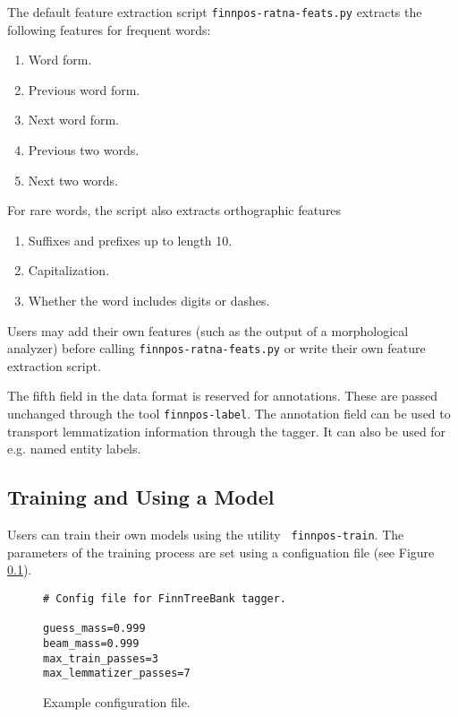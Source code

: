 \documentclass{llncs}
\begin{document}
The default feature extraction script {\tt finnpos-ratna-feats.py}
extracts the following features for frequent words:

\begin{enumerate}
\item Word form.
\item Previous word form.
\item Next word form.
\item Previous two words.
\item Next two words.
\end{enumerate}

For rare words, the script also extracts orthographic features

\begin{enumerate}
\item Suffixes and prefixes up to length 10.
\item Capitalization.
\item Whether the word includes digits or dashes.
\end{enumerate}

Users may add their own features (such as the output of a
morphological analyzer) before calling {\tt finnpos-ratna-feats.py} or
write their own feature extraction script.

The fifth field in the data format is reserved for annotations. These
are passed unchanged through the tool {\tt finnpos-label}. The
annotation field can be used to transport lemmatization information
through the tagger. It can also be used for e.g. named entity labels.

\subsection{Training and Using a Model}

Users can train their own models using the utility {\tt
  finnpos-train}. The parameters of the training process are set using
a configuation file (see Figure \ref{}).

\begin{figure}
\begin{framed}
\begin{verbatim}
# Config file for FinnTreeBank tagger.

guess_mass=0.999
beam_mass=0.999
max_train_passes=3
max_lemmatizer_passes=7
\end{verbatim}
\end{framed}
\caption{Example configuration file.}
\end{figure}
\end{document}
